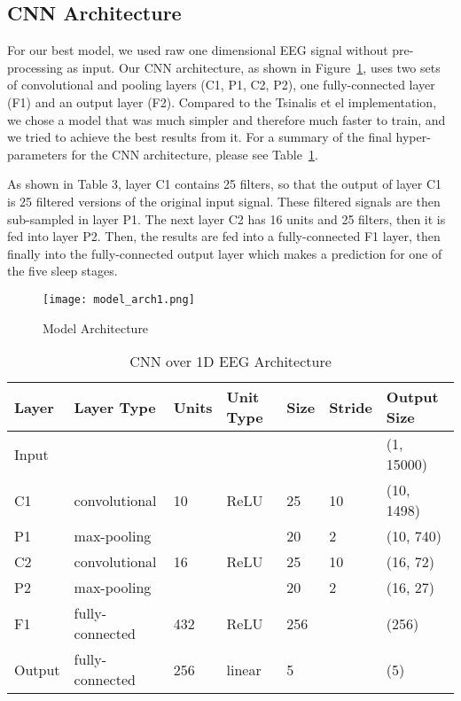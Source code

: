 \documentclass{amia}
\begin{document}
\subsection*{CNN Architecture}
For our best model, we used raw one dimensional EEG signal without pre-processing as input. Our CNN architecture, as shown in Figure~\ref{fig:figure3}, uses two sets of convolutional and pooling layers (C1, P1, C2, P2), one fully-connected layer (F1) and an output layer (F2). Compared to the Tsinalis et el implementation, we chose a model that was much simpler and therefore much faster to train, and we tried to achieve the best results from it. For a summary of the final hyper-parameters for the CNN architecture, please see Table~\ref{tab:a}. 

As shown in Table 3, layer C1 contains 25 filters, so that the output of layer C1 is 25 filtered versions of the original input signal. These filtered signals are then sub-sampled in layer P1. The next layer C2 has 16 units and 25 filters, then it is fed into layer P2. Then, the results are fed into a fully-connected F1 layer, then finally into the fully-connected output layer which makes a prediction for one of the five sleep stages. 

\begin{figure}[htb]
\begin{center}
\texttt{[image: model\_arch1.png]}
\end{center}
\caption{Model Architecture}
\label{fig:figure3}
\end{figure}


\begin{table}[h]
\centering
\caption{CNN over 1D EEG Architecture}\label{tab:a}
\begin{tabular}{| l | l | l | l | l | l | l |}
\hline
Layer & Layer Type & Units & Unit Type & Size & Stride & Output Size \\ \hline
Input & & & & & & (1, 15000) \\ \hline
C1 & convolutional & 10 & ReLU & 25 & 10 & (10, 1498)  \\ \hline
P1 & max-pooling & & & 20 & 2 & (10, 740) \\ \hline
C2 & convolutional & 16 & ReLU & 25 & 10 & (16, 72) \\ \hline
P2 & max-pooling &  &  & 20 & 2 & (16, 27) \\ \hline
F1 & fully-connected & 432 & ReLU & 256 &  & (256) \\ \hline
Output & fully-connected & 256 & linear & 5 &  & (5) \\ \hline

\end{tabular}
\end{table}
\end{document}
